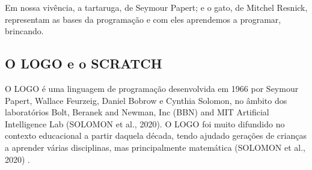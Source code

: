 \documentclass[
12pt,		%
openright,	%
twoside,  %
a4paper,			%
chapter=TITLE,		%
english,			%
french,				%
spanish,			%
brazil				%
]{USPSC-classe/USPSC}
\begin{document}
Em nossa viv\^encia, a tartaruga, de Seymour Papert; e o gato, de Mitchel Resnick,  representam as bases da  programa\c{c}\~ao e com eles aprendemos a  programar,  brincando.




\subsection[O LOGO e o SCRATCH]{O LOGO e o SCRATCH}\label{O LOGO e o SCRATCH}
O LOGO \'e uma linguagem de programa\c{c}\~ao desenvolvida em 1966 por Seymour Papert, Wallace Feurzeig, Daniel Bobrow e Cynthia Solomon, no \^ambito dos laborat\'orios Bolt, Beranek and Newman, Inc (BBN) and MIT Artificial Intelligence Lab (SOLOMON et al., 2020). O LOGO foi muito difundido no contexto educacional a partir daquela d\'ecada, tendo ajudado gera\c{c}\~oes de crian\c{c}as a aprender v\'arias disciplinas, mas principalmente matem\'atica  (SOLOMON et al., 2020) .
\end{document}
